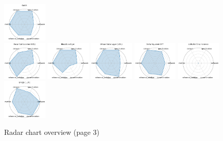 \begin{figure}[ht!]
\includegraphics[width=0.1900\textwidth]{images/gess_radar.pdf}
\\[1ex]
\includegraphics[width=0.1900\textwidth]{images/vocal_call_locator_vcl_radar.pdf}
\includegraphics[width=0.1900\textwidth]{images/massspecgym_radar.pdf}
\includegraphics[width=0.1900\textwidth]{images/urban_data_layer_udl_radar.pdf}
\includegraphics[width=0.1900\textwidth]{images/delta_squared-dft_radar.pdf}
\includegraphics[width=0.1900\textwidth]{images/llms_for_crop_science_radar.pdf}
\\[1ex]
\includegraphics[width=0.1900\textwidth]{images/spiqa_llm_radar.pdf}
\caption{Radar chart overview (page 3)}
\end{figure}

